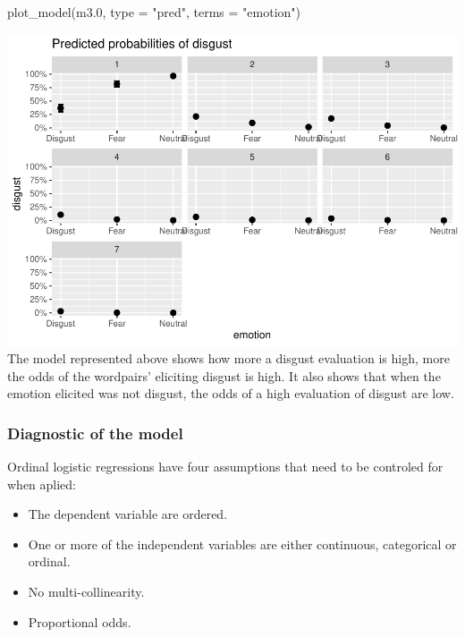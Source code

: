 \documentclass[
]{article}
\newenvironment{Shaded}{\begin{snugshade}}{\end{snugshade}}
\newcommand{\AttributeTok}[1]{\textcolor[rgb]{0.77,0.63,0.00}{#1}}
\newcommand{\FloatTok}[1]{\textcolor[rgb]{0.00,0.00,0.81}{#1}}
\newcommand{\FunctionTok}[1]{\textcolor[rgb]{0.00,0.00,0.00}{#1}}
\newcommand{\NormalTok}[1]{#1}
\newcommand{\StringTok}[1]{\textcolor[rgb]{0.31,0.60,0.02}{#1}}
\providecommand{\tightlist}{%
  \setlength{\itemsep}{0pt}\setlength{\parskip}{0pt}}
\begin{document}
\begin{Shaded}
\begin{Highlighting}[]
\FunctionTok{plot\_model}\NormalTok{(m3}\FloatTok{.0}\NormalTok{, }\AttributeTok{type =} \StringTok{"pred"}\NormalTok{, }\AttributeTok{terms =} \StringTok{"emotion"}\NormalTok{)}
\end{Highlighting}
\end{Shaded}

\includegraphics{DAP_v4-1-22_files/figure-latex/unnamed-chunk-9-1.pdf}
The model represented above shows how more a disgust evaluation is high,
more the odds of the wordpairs' eliciting disgust is high. It also shows
that when the emotion elicited was not disgust, the odds of a high
evaluation of disgust are low.

\hypertarget{diagnostic-of-the-model}{%
\subsubsection{Diagnostic of the model}\label{diagnostic-of-the-model}}

Ordinal logistic regressions have four assumptions that need to be
controled for when aplied:

\begin{itemize}
\tightlist
\item
  The dependent variable are ordered.
\item
  One or more of the independent variables are either continuous,
  categorical or ordinal.
\item
  No multi-collinearity.
\item
  Proportional odds.
\end{itemize}
\end{document}
